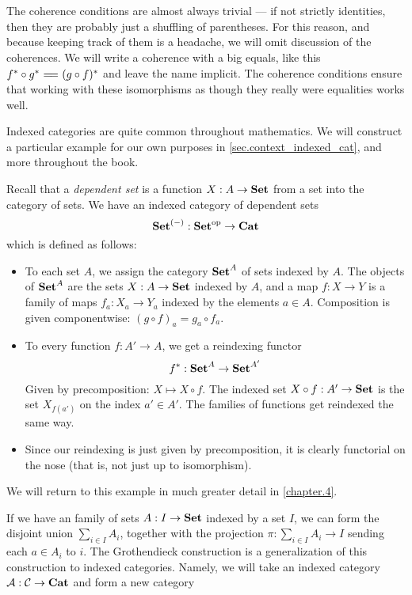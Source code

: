 \documentclass[DynamicalBook]{subfiles}
\begin{document}
\begin{remark}\label{rmk.coherence_condition_indexed_cat}
  The coherence conditions are almost always trivial --- if not strictly
  identities, then they are probably just a shuffling of parentheses. For this
  reason, and because keeping track of them is a headache, we will omit
  discussion of the coherences. We will write a coherence with a big equals,
  like this $f^{\ast} \circ g^{\ast} \xequals{\phantom{ \gamma_{g, f} }} (g \circ
    f)^{\ast}$ and leave the name implicit. The coherence conditions ensure that
    working with these isomorphisms as though they really were equalities works well.
\end{remark}

Indexed categories are quite common throughout mathematics. We will construct a
particular example for our own purposes in \cref{sec.context_indexed_cat}, and
more throughout the book.

\begin{example}\label{ex.indexed_cat_of_dependent_sets}
  Recall that a \emph{dependent set} is a function $X : A \to \textbf{Set}$ from a set
  into the category of sets. We have an indexed category of dependent sets
  $$\textbf{Set}^{(-)} : \textbf{Set}^{\textnormal{op}} \to \textbf{Cat}$$
  which is defined as follows:
  \begin{itemize}
    \item To each set $A$, we assign the category $\textbf{Set}^A$ of sets indexed by
      $A$. The objects of $\textbf{Set}^A$ are the sets $X : A \to \textbf{Set}$ indexed by
      $A$, and a map $f : X \to Y$ is a family of maps $f_a : X_a \to Y_a$
      indexed by the elements $a \in A$. Composition is given componentwise: $(g
      \circ f)_a = g_a \circ f_a$.
    \item To every function $f : A' \to A$, we get a reindexing functor
$$f^{\ast} : \textbf{Set}^A \to \textbf{Set}^{A'}$$
   Given by precomposition: $X \mapsto X \circ f$. The indexed set $X \circ f :
   A' \to \textbf{Set}$ is the set $X_{f(a')}$ on the index $a' \in A'$. The families
   of functions get reindexed the same way.
     \item Since our reindexing is just given by precomposition, it is clearly
       functorial on the nose (that is, not just up to isomorphism).
  \end{itemize}
  We will return to this example in much greater detail in \cref{chapter.4}.
\end{example} 


If we have an family of sets $A : I \to \textbf{Set}$ indexed by a set $I$, we can
form the disjoint union $\sum_{i \in I} A_i$, together with the projection $\pi
: \sum_{i \in I} A_i \to I$ sending each $a \in A_i$ to $i$. The Grothendieck
construction is a generalization of this construction to indexed categories. Namely, we will take an indexed category $\mathcal{A}
: \mathcal{C} \to \textbf{Cat}$ and form a new category
\end{document}
